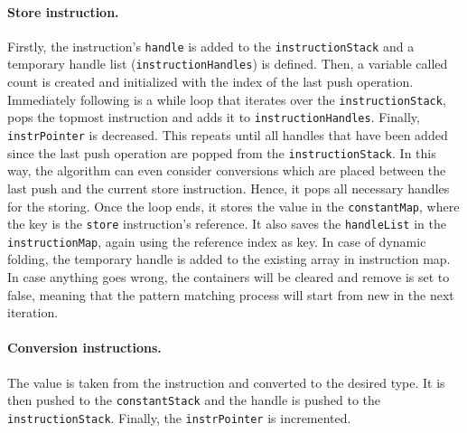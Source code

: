 \paragraph{Store instruction.}
Firstly, the instruction’s \texttt{handle} is added to the \texttt{instructionStack} and a temporary handle list (\texttt{instructionHandles}) is defined. Then, a variable called count is created and initialized with the index of the last push operation. Immediately following is a while loop that iterates over the \texttt{instructionStack}, pops the topmost instruction and adds it to \texttt{instructionHandles}. Finally, \texttt{instrPointer} is decreased. This repeats until all handles that have been added since the last push operation are popped from the \texttt{instructionStack}. In this way, the algorithm can even consider conversions which are placed between the last push and the current store instruction. Hence, it pops all necessary handles for the storing. Once the loop ends, it stores the value in the \texttt{constantMap}, where the key is the \texttt{store} instruction’s reference. It also saves the \texttt{handleList} in the \texttt{instructionMap}, again using the reference index as key. In case of dynamic folding, the temporary handle is added to the existing array in instruction map. In case anything goes wrong, the containers will be cleared and remove is set to false, meaning that the pattern matching process will start from new in the next iteration.

%

\paragraph{Conversion instructions.}
The value is taken from the instruction and converted to the desired type.  It is then pushed to the \texttt{constantStack} and the handle is pushed to the \texttt{instructionStack}. Finally, the \texttt{instrPointer} is incremented. 

%

